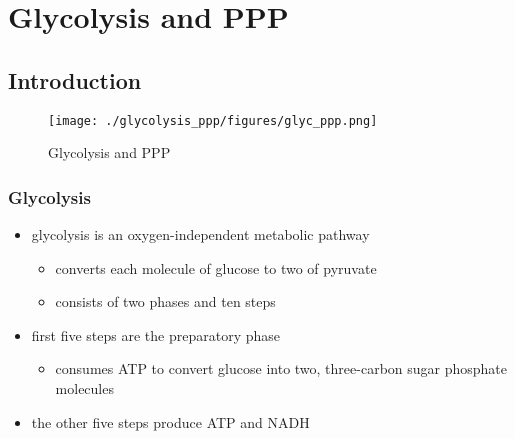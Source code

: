 \documentclass{scrartcl}
\begin{document}
\section{Glycolysis and PPP}
\label{sec:org2ca110b}
\subsection{Introduction}
\label{sec:orgbcf49d7}
\begin{figure}[htbp]
\centering
\texttt{[image: ./glycolysis\_ppp/figures/glyc\_ppp.png]}
\caption{\label{fig:orga59842b}
Glycolysis and PPP}
\end{figure}

\subsubsection{Glycolysis}
\label{sec:orgc8ee263}
\begin{itemize}
\item glycolysis is an oxygen-independent metabolic pathway
\begin{itemize}
\item converts each molecule of glucose to two of pyruvate
\item consists of two phases and ten steps
\end{itemize}
\item first five steps are the preparatory phase
\begin{itemize}
\item consumes ATP to convert glucose into two, three-carbon sugar
phosphate molecules
\end{itemize}
\item the other five steps produce ATP and NADH
\end{itemize}
\end{document}
